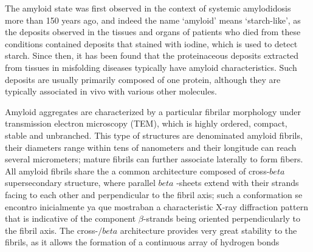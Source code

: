 The amyloid state was first observed in the context of systemic amylodidosis more than 150 years ago, and indeed the name ‘amyloid’ means ‘starch-like’, 
as the deposits observed in the tissues and organs of patients who died from these conditions contained deposits that stained
with iodine, which is used to detect starch. Since then, it has been found that the proteinaceous deposits extracted from tissues in misfolding diseases
typically have amyloid characteristics. Such deposits are usually primarily composed of one protein, although they are typically associated in vivo with various other molecules.

Amyloid aggregates are characterized by a particular fibrilar morphology under transmission electron microscopy (TEM), which is highly ordered, compact, stable
and unbranched. This type of structures are denominated amyloid fibrils, their diameters range within tens of nanometers and their longitude can reach several
micrometers; mature fibrils can further associate laterally to form fibers.
All amyloid fibrils share the a common architecture composed of cross-$beta$ supersecondary structure,
where parallel $beta$ -sheets extend with their strands facing to each other and perpendicular to the fibril axis; 
such a conformation se encontro inicialmente ya que mostraban a characteristic X-ray diffraction pattern that is indicative of the component $\beta$-strands being oriented
perpendicularly to the fibril axis. 
The cross-$/beta$ architecture provides very great stability to the fibrils, as it allows the formation of a continuous array of hydrogen bonds

